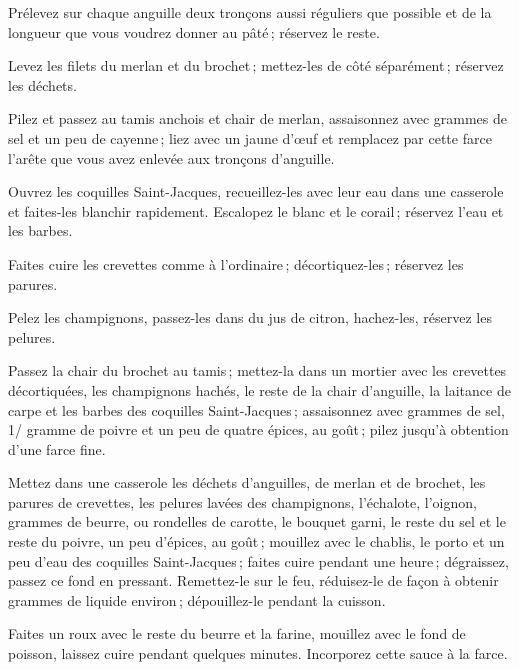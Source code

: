 Prélevez sur chaque anguille deux tronçons aussi réguliers que possible et de
la longueur que vous voudrez donner au pâté ; réservez le reste.

Levez les filets du merlan et du brochet ; mettez-les de côté séparément ;
réservez les déchets.

Pilez et passez au tamis anchois et chair de merlan, assaisonnez avec {\mmm} grammes
de sel et un peu de cayenne ; liez avec un jaune d'œuf et remplacez par cette
farce l'arête que vous avez enlevée aux tronçons d'anguille.

Ouvrez les coquilles Saint-Jacques, recueillez-les avec leur eau dans une
casserole et faites-les blanchir rapidement. Escalopez le blanc et le corail ;
réservez l'eau et les barbes.

Faites cuire les crevettes comme à l'ordinaire ; décortiquez-les ; réservez les
parures.

Pelez les champignons, passez-les dans du jus de citron, hachez-les, réservez les
pelures.

Passez la chair du brochet au tamis ; mettez-la dans un mortier avec les
crevettes décortiquées, les champignons hachés, le reste de la chair
d'anguille, la laitance de carpe et les barbes des coquilles Saint-Jacques ;
assaisonnez avec {\mmm} grammes de sel, 1/{\mmm} gramme de poivre et un peu de quatre
épices, au goût ; pilez jusqu'à obtention d'une farce fine.

Mettez dans une casserole les déchets d'anguilles, de merlan et de brochet, les
parures de crevettes, les pelures lavées des champignons, l'échalote, l'oignon,
{\mmm} grammes de beurre, {\mmm} ou {\mmm} rondelles de carotte, le bouquet garni, le reste
du sel et le reste du poivre, un peu d'épices, au goût ; mouillez avec le
chablis, le porto et un peu d'eau des coquilles Saint-Jacques ; faites cuire
pendant une heure ; dégraissez, passez ce fond en pressant. Remettez-le sur le
feu, réduisez-le de façon à obtenir {\mmm} grammes de liquide environ ;
dépouillez-le pendant la cuisson.

Faites un roux avec le reste du beurre et la farine, mouillez avec le fond de
poisson, laissez cuire pendant quelques minutes. Incorporez cette sauce à la
farce.

\medskip

